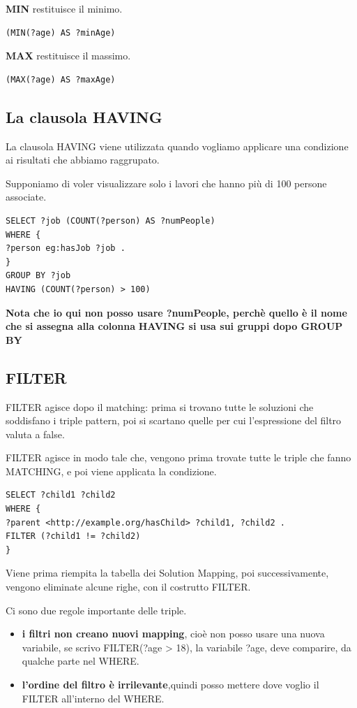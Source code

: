 \textbf{MIN} restituisce il minimo.
\begin{lstlisting}
(MIN(?age) AS ?minAge)
\end{lstlisting}


\textbf{MAX} restituisce il massimo.
\begin{lstlisting}
(MAX(?age) AS ?maxAge)
\end{lstlisting}

\subsection{La clausola HAVING}
La clausola HAVING viene utilizzata quando vogliamo applicare una condizione ai risultati che
abbiamo raggrupato.


Supponiamo di voler visualizzare solo i lavori che hanno più di 100 persone associate.
\begin{lstlisting}
SELECT ?job (COUNT(?person) AS ?numPeople)
WHERE {
?person eg:hasJob ?job .
}
GROUP BY ?job
HAVING (COUNT(?person) > 100)
\end{lstlisting}
\textbf{Nota che io qui non posso usare ?numPeople, perchè quello è il nome che si assegna alla colonna}
\textbf{HAVING si usa sui gruppi dopo GROUP BY}

\subsection{FILTER}
FILTER agisce dopo il matching: prima si trovano tutte le soluzioni che soddisfano i triple
pattern, poi si scartano quelle per cui l'espressione del filtro valuta a false.

FILTER agisce in modo tale che, vengono prima trovate tutte le triple che fanno
MATCHING, e poi viene applicata la condizione.

\begin{lstlisting}
SELECT ?child1 ?child2
WHERE {
?parent <http://example.org/hasChild> ?child1, ?child2 .
FILTER (?child1 != ?child2)
}
\end{lstlisting}

Viene prima riempita la tabella dei Solution Mapping, poi successivamente, vengono eliminate alcune righe, con il costrutto FILTER.


Ci sono due regole importante delle triple.
\begin{itemize}
    \item \textbf{i filtri non creano nuovi mapping}, cioè non posso usare una nuova variabile, se scrivo FILTER(?age > 18), la variabile ?age, deve comparire, da qualche parte nel WHERE.
    \item \textbf{ l’ordine del filtro è irrilevante},quindi posso mettere dove voglio il FILTER all'interno del WHERE.
\end{itemize}

